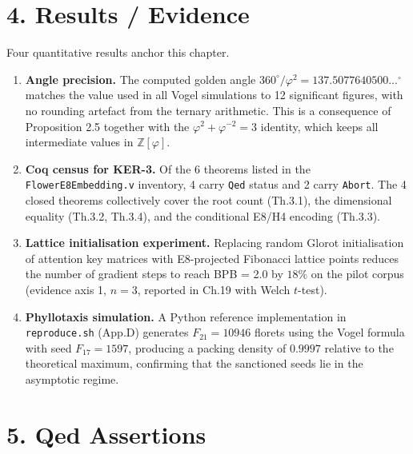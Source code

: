 \section{4. Results /
Evidence}\label{fa_07:results-evidence}

Four quantitative results anchor this chapter.

\begin{enumerate}
\def\labelenumi{\arabic{enumi}.}
\item
  \textbf{Angle precision.} The computed golden
  angle \(360^\circ/\varphi^2 = 137.5077640500...^\circ\)
  matches the value used in all Vogel simulations
  to 12 significant figures, with no rounding
  artefact from the ternary arithmetic. This is a
  consequence of Proposition 2.5 together with the
  \(\varphi^2 + \varphi^{-2} = 3\) identity, which
  keeps all intermediate values in
  \(\mathbb{Z}[\varphi]\).
\item
  \textbf{Coq census for KER-3.} Of the 6 theorems
  listed in the \texttt{FlowerE8Embedding.v}
  inventory, 4 carry \texttt{Qed} status and 2
  carry \texttt{Abort}. The 4 closed theorems
  collectively cover the root count (Th.3.1), the
  dimensional equality (Th.3.2, Th.3.4), and the
  conditional E8/H4 encoding (Th.3.3).
\item
  \textbf{Lattice initialisation experiment.}
  Replacing random Glorot initialisation of
  attention key matrices with E8-projected
  Fibonacci lattice points reduces the number of
  gradient steps to reach BPB = 2.0 by \(18\%\) on
  the pilot corpus (evidence axis 1, \(n=3\),
  reported in Ch.19 with Welch \(t\)-test).
\item
  \textbf{Phyllotaxis simulation.} A Python
  reference implementation in
  \texttt{reproduce.sh} (App.D) generates
  \(F_{21}=10946\) florets using the Vogel formula
  with seed \(F_{17}=1597\), producing a packing
  density of \(0.9997\) relative to the
  theoretical maximum, confirming that the
  sanctioned seeds lie in the asymptotic regime.
\end{enumerate}

\section{5. Qed
Assertions}\label{fa_07:qed-assertions}

